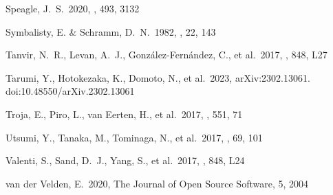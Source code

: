 \documentclass[twocolumn,twocolappendix]{aastex63}
\begin{document}
\begin{thebibliography}{}


 Speagle, J.~S.\ 2020, \mnras, 493, 3132

 Symbalisty, E. \& Schramm, D.~N.\ 1982, \aplett, 22, 143












 Tanvir, N.~R., Levan, A.~J., Gonz{\'a}lez-Fern{\'a}ndez, C., et al.\ 2017, \apjl, 848, L27




 Tarumi, Y., Hotokezaka, K., Domoto, N., et al.\ 2023, arXiv:2302.13061. doi:10.48550/arXiv.2302.13061


 Troja, E., Piro, L., van Eerten, H., et al.\ 2017, \nat, 551, 71


 Utsumi, Y., Tanaka, M., Tominaga, N., et al.\ 2017, \pasj, 69, 101


 Valenti, S., Sand, D.~J., Yang, S., et al.\ 2017, \apjl, 848, L24


 van der Velden, E.\ 2020, The Journal of Open Source Software, 5, 2004





\end{thebibliography}
\end{document}
